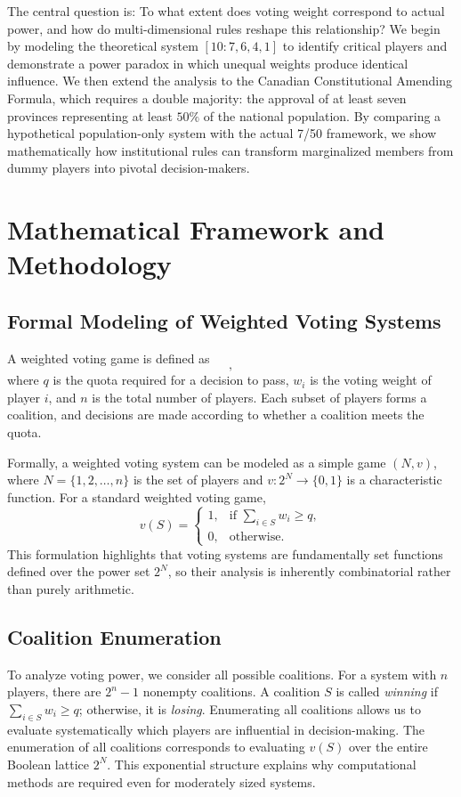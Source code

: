 \documentclass[lettersize,journal]{IEEEtran}
\begin{document}
The central question is: To what extent does voting weight correspond to actual power, and how do multi-dimensional rules reshape this relationship? We begin by modeling the theoretical system $[10:7,6,4,1]$ to identify critical players and demonstrate a power paradox in which unequal weights produce identical influence. We then extend the analysis to the Canadian Constitutional Amending Formula, which requires a double majority: the approval of at least seven provinces representing at least $50\%$ of the national population. By comparing a hypothetical population-only system with the actual 7/50 framework, we show mathematically how institutional rules can transform marginalized members from dummy players into pivotal decision-makers.

\section{Mathematical Framework and Methodology}
\subsection{Formal Modeling of Weighted Voting Systems}
A weighted voting game is defined as
\begin{equation}
[q:w_1,w_2,\dots,w_n],
\end{equation}
where $q$ is the quota required for a decision to pass, $w_i$ is the voting weight of player $i$, and $n$ is the total number of players. Each subset of players forms a coalition, and decisions are made according to whether a coalition meets the quota.

Formally, a weighted voting system can be modeled as a simple game $(N,v)$, where $N=\{1,2,\dots,n\}$ is the set of players and $v:2^N\to\{0,1\}$ is a characteristic function. For a standard weighted voting game,
\begin{equation}
v(S)=
\begin{cases}
1, & \text{if } \sum_{i\in S} w_i \ge q,\\
0, & \text{otherwise.}
\end{cases}
\end{equation}
This formulation highlights that voting systems are fundamentally set functions defined over the power set $2^N$, so their analysis is inherently combinatorial rather than purely arithmetic.

\subsection{Coalition Enumeration}
To analyze voting power, we consider all possible coalitions. For a system with $n$ players, there are $2^n-1$ nonempty coalitions. A coalition $S$ is called \emph{winning} if $\sum_{i\in S} w_i \ge q$; otherwise, it is \emph{losing}. Enumerating all coalitions allows us to evaluate systematically which players are influential in decision-making. The enumeration of all coalitions corresponds to evaluating $v(S)$ over the entire Boolean lattice $2^N$. This exponential structure explains why computational methods are required even for moderately sized systems.
\end{document}
